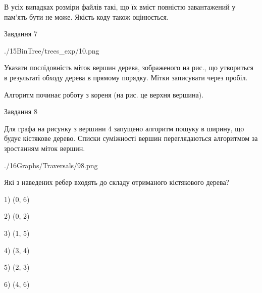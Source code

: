 \documentclass[12pt, ukrainian]{article}
\begin{document}
{В усіх випадках розміри файлів такі, що їх вміст повністю завантажений у пам'ять бути не може. Якість коду також оцінюється.



\vspace{10mm}\par

\newpage
\begin{minipage}[t]{9.7cm}
               
{\begin{center}Завдання {7}\end{center}}
\vspace{-6mm}

\begin{center}
	{./15BinTree/trees_exp/10.png}
\end{center}
Указати послідовність міток вершин дерева, зображеного на рис., що утвориться в результаті обходу дерева в прямому порядку. Мітки записувати через пробіл.\par Алгоритм починає роботу з кореня (на рис. це верхня вершина).\par

\end{minipage}
\vline \hspace{8mm}
\begin{minipage}[t]{8.0cm}
               
{\begin{center}Завдання {8}\end{center}}
\vspace{-6mm}
Для графа на рисунку з вершини 4 запущено алгоритм пошуку в ширину, що будує кістякове дерево. Списки суміжності вершин переглядаються алгоритмом за зростанням міток вершин.\par
\begin{center}
	{./16Graphs/Traversals/98.png}
\end{center}
\par Які з наведених ребер входять до складу отриманого кістякового дерева?\par
1) (0, 6)\par
2) (0, 2)\par
3) (1, 5)\par
4) (3, 4)\par
5) (2, 3)\par
6) (4, 6)\par
{\vskip 15pt} \par


\end{minipage}}
\end{document}
